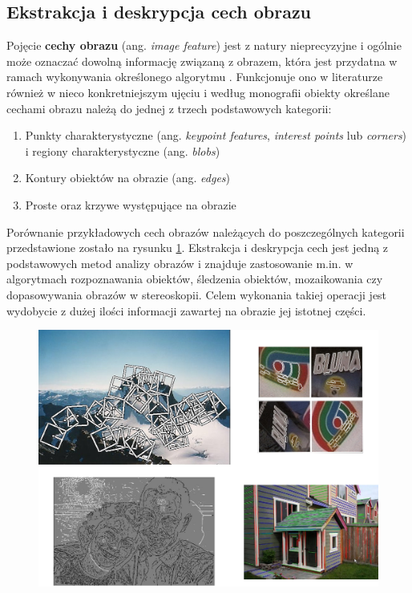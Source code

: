 \subsection{Ekstrakcja i deskrypcja cech obrazu}
\label{subsec:Ekstrakcja_i_deskrypcja_cech_obrazu}
Pojęcie \textbf{cechy obrazu} (ang. \textit{image feature}) jest z natury nieprecyzyjne i ogólnie może oznaczać dowolną informację związaną z obrazem, która jest przydatna w ramach wykonywania określonego algorytmu \cite{Campoy2009}. Funkcjonuje ono w literaturze również w nieco konkretniejszym ujęciu i według monografii \cite{Szeliski2011} obiekty określane cechami obrazu należą do jednej z trzech podstawowych kategorii:

\begin{enumerate}
	\item Punkty charakterystyczne (ang. \textit{keypoint features}, \textit{interest points} lub \textit{corners}) i regiony charakterystyczne (ang. \textit{blobs})
	\item Kontury obiektów na obrazie (ang. \textit{edges})
	\item Proste oraz krzywe występujące na obrazie
\end{enumerate}

Porównanie przykładowych cech obrazów należących do poszczególnych kategorii przedstawione zostało na rysunku \ref{fig:Przyklady_cech}. Ekstrakcja i deskrypcja cech jest jedną z podstawowych metod analizy obrazów i znajduje zastosowanie m.in. w algorytmach rozpoznawania obiektów, śledzenia obiektów, mozaikowania czy dopasowywania obrazów w stereoskopii. Celem wykonania takiej operacji jest wydobycie z dużej ilości informacji zawartej na obrazie jej istotnej części.

\begin{figure}[!htb]
	\begin{center}
		\includegraphics[width=12cm]{images/object_features.png}
	\end{center}	
\label{fig:Przyklady_cech}
\end{figure}

